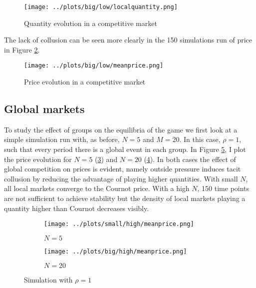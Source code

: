 \documentclass[american]{scrartcl}
\begin{document}
\begin{center}
    \begin{figure}[H]
        \center
        \texttt{[image: ../plots/big/low/localquantity.png]}
        \caption{Quantity evolution in a competitive market}
        \label{fig:large_local}
    \end{figure}
\end{center}

The lack of collusion can be seen more clearly in the 150 simulations run of price in Figure \ref{fig:price_large_local}.

\begin{center}
    \begin{figure}[H]
        \center
        \texttt{[image: ../plots/big/low/meanprice.png]}
        \caption{Price evolution in a competitive market}
        \label{fig:price_large_local}
    \end{figure}
\end{center}

\subsection{Global markets}

To study the effect of groups on the equilibria of the game we first look at a simple simulation run with, as before, $N = 5$ and $M = 20$. In this case, $\rho = 1$, such that every period there is a global event in each group. In Figure \ref{fig:cert}, I plot the price evolution for $N = 5$ (\ref{fig:cert:small}) and $N = 20$ (\ref{fig:cert:big}). In both cases the effect of global competition on prices is evident, namely outside pressure induces tacit collusion by reducing the advantage of playing higher quantities. With small $N$, all local markets converge to the Cournot price. With a high $N$, 150 time points are not sufficient to achieve stability but the density of local markets playing a quantity higher than Cournot decreases visibly.

\begin{figure}[H]
    \begin{subfigure}{.5\textwidth}
        \centering
        \texttt{[image: ../plots/small/high/meanprice.png]}
        \caption{$N = 5$}
        \label{fig:cert:small}
    \end{subfigure}%
    \begin{subfigure}{.5\textwidth}
        \centering
        \texttt{[image: ../plots/big/high/meanprice.png]}
        \caption{$N = 20$}
        \label{fig:cert:big}
    \end{subfigure}
    \caption{Simulation with $\rho = 1$}
    \label{fig:cert}
\end{figure}
\end{document}

